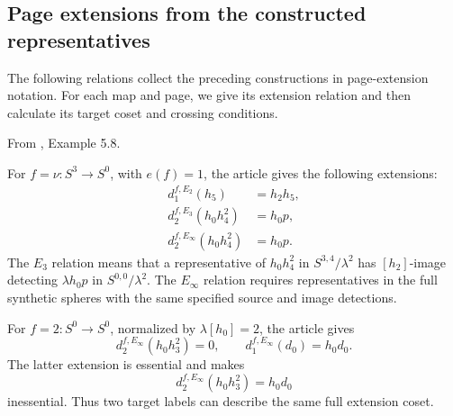 \subsection{Page extensions from the constructed representatives}

The following relations collect the preceding constructions in
page-extension notation. For each map and page, we give its extension relation and then
calculate its target coset and crossing conditions.

\begin{proposition}
\label{paper:5.8}
\label{exam:extonEn}
From \cite{LWX126}, Example 5.8.\par
For $f=\nu:S^3\to S^0$, with $e(f)=1$, the article gives the following extensions:
\[
\begin{aligned}
d_1^{f,E_2}(h_5)&=h_2h_5,\\
d_2^{f,E_3}(h_0h_4^2)&=h_0p,\\
d_2^{f,E_\infty}(h_0h_4^2)&=h_0p.
\end{aligned}
\]
The $E_3$ relation means that a representative of $h_0h_4^2$ in $S^{3,4}/\lambda^2$ has $[h_2]$-image detecting $\lambda h_0p$ in $S^{0,0}/\lambda^2$. The $E_\infty$ relation requires representatives in the full synthetic spheres with the same specified source and image detections.

For $f=2:S^0\to S^0$, normalized by $\lambda[h_0]=2$, the article gives
\[
d_2^{f,E_\infty}(h_0h_3^2)=0,
\qquad d_1^{f,E_\infty}(d_0)=h_0d_0.
\]
The latter extension is essential and makes
\[
d_2^{f,E_\infty}(h_0h_3^2)=h_0d_0
\]
inessential. Thus two target labels can describe the same full extension coset.
\end{proposition}

